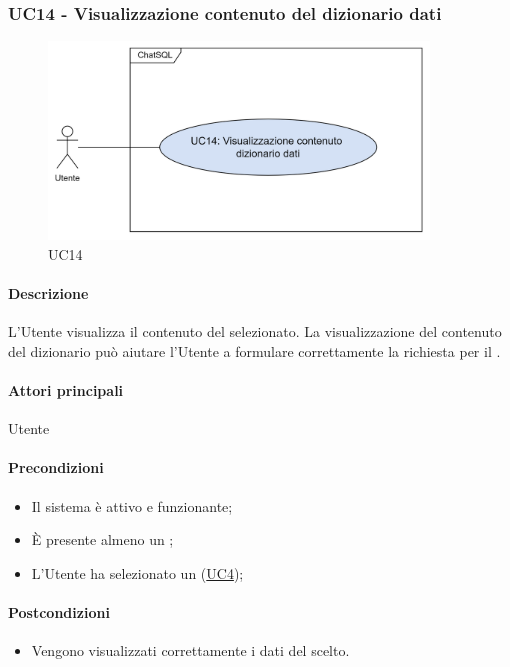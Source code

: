 \subsubsection{UC14 - Visualizzazione contenuto del dizionario dati}\label{UC14}

\begin{figure}[H]
  \centering
  \includegraphics[width=0.90\textwidth]{assets/uc14.png}
  \caption{UC14}
\end{figure}

\paragraph*{Descrizione}
L'Utente visualizza il contenuto del  selezionato. La visualizzazione del contenuto del dizionario può aiutare l'Utente a formulare correttamente la richiesta per il .

\paragraph*{Attori principali}
Utente

\paragraph*{Precondizioni}
\begin{itemize}
  \item Il sistema è attivo e funzionante;
  \item È presente almeno un ;
  \item L'Utente ha selezionato un  (\hyperref[UC4]{UC4});
\end{itemize}

\paragraph*{Postcondizioni}
\begin{itemize}
  \item Vengono visualizzati correttamente i dati del  scelto.
\end{itemize}

